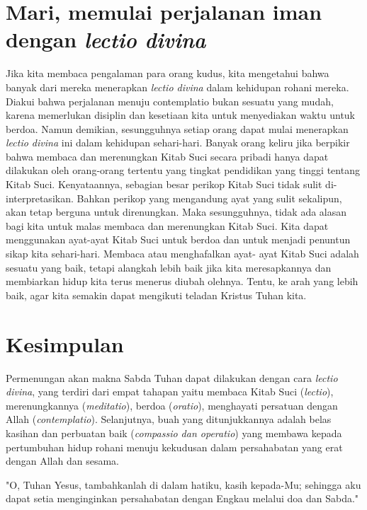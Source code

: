 \section{Mari, memulai perjalanan iman dengan \textit{lectio divina}}

Jika kita membaca pengalaman para orang kudus, kita mengetahui bahwa banyak dari mereka menerapkan \textit{lectio divina} dalam kehidupan rohani mereka. Diakui bahwa perjalanan menuju contemplatio bukan sesuatu yang mudah, karena memerlukan disiplin dan kesetiaan kita untuk menyediakan waktu untuk berdoa. Namun demikian, sesungguhnya setiap orang dapat mulai menerapkan \textit{lectio divina} ini dalam kehidupan sehari-hari.
Banyak orang keliru jika berpikir bahwa membaca dan merenungkan Kitab Suci secara pribadi hanya dapat dilakukan oleh orang-orang tertentu yang tingkat pendidikan yang tinggi tentang Kitab Suci. Kenyataannya, sebagian besar perikop Kitab Suci tidak sulit di-interpretasikan. Bahkan perikop yang mengandung ayat yang sulit sekalipun, akan tetap berguna untuk direnungkan. Maka sesungguhnya, tidak ada alasan bagi kita untuk malas membaca dan merenungkan Kitab Suci. Kita dapat menggunakan ayat-ayat Kitab Suci untuk berdoa dan untuk menjadi penuntun sikap kita sehari-hari. Membaca atau menghafalkan ayat- ayat Kitab Suci adalah sesuatu yang baik, tetapi alangkah lebih baik jika kita meresapkannya dan membiarkan hidup kita terus menerus diubah olehnya. Tentu, ke arah yang lebih baik, agar kita semakin dapat mengikuti teladan Kristus Tuhan kita.

\section{Kesimpulan}
Permenungan akan makna Sabda Tuhan dapat dilakukan dengan cara \textit{lectio divina}, yang terdiri dari empat tahapan yaitu membaca Kitab Suci (\textit{lectio}), merenungkannya (\textit{meditatio}), berdoa (\textit{oratio}), menghayati persatuan dengan Allah (\textit{contemplatio}). Selanjutnya, buah yang ditunjukkannya adalah belas kasihan dan perbuatan baik (\textit{compassio dan operatio}) yang membawa kepada pertumbuhan hidup rohani menuju kekudusan dalam persahabatan yang erat dengan Allah dan sesama.

"O, Tuhan Yesus, tambahkanlah di dalam hatiku, kasih kepada-Mu; sehingga aku dapat setia menginginkan persahabatan dengan Engkau melalui doa dan Sabda."